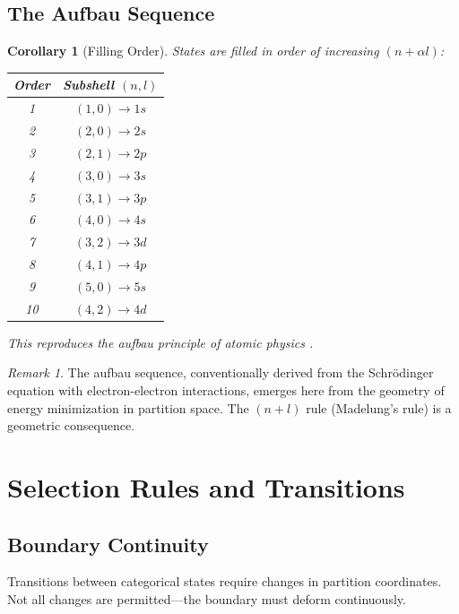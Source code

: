 \documentclass[twocolumn,10pt,a4paper]{article}
\newtheorem{corollary}[theorem]{Corollary}
\theoremstyle{definition}
\theoremstyle{remark}
\newtheorem{remark}[theorem]{Remark}
\begin{document}
\subsection{The Aufbau Sequence}

\begin{corollary}[Filling Order]
States are filled in order of increasing $(n + \alpha l)$:
\begin{center}
\begin{tabular}{cc}
\toprule
Order & Subshell $(n, l)$ \\
\midrule
1 & $(1, 0) \to 1s$ \\
2 & $(2, 0) \to 2s$ \\
3 & $(2, 1) \to 2p$ \\
4 & $(3, 0) \to 3s$ \\
5 & $(3, 1) \to 3p$ \\
6 & $(4, 0) \to 4s$ \\
7 & $(3, 2) \to 3d$ \\
8 & $(4, 1) \to 4p$ \\
9 & $(5, 0) \to 5s$ \\
10 & $(4, 2) \to 4d$ \\
\bottomrule
\end{tabular}
\end{center}
This reproduces the aufbau principle of atomic physics \cite{aufbau}.
\end{corollary}

\begin{remark}
The aufbau sequence, conventionally derived from the Schr\"{o}dinger equation with electron-electron interactions, emerges here from the geometry of energy minimization in partition space. The $(n + l)$ rule (Madelung's rule) is a geometric consequence.
\end{remark}

\section{Selection Rules and Transitions}
\label{sec:transitions}

\subsection{Boundary Continuity}

Transitions between categorical states require changes in partition coordinates. Not all changes are permitted---the boundary must deform continuously.
\end{document}

